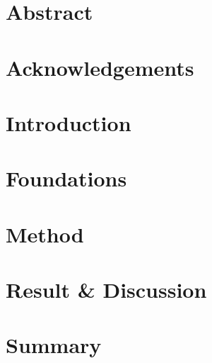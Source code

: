 \setcounter{page}{1}
\pagebreak
\part*{Abstract}

\pagebreak

\part*{Acknowledgements}

\pagebreak


\tableofcontents
\listoffigures
\listoftables

\pagebreak


\fancyfoot[CE,LO]{\leftmark}
\fancyfoot[CE,CO]{ }

\part{Introduction}


\pagebreak
\part{Foundations}


\pagebreak
\part{Method}


\pagebreak
\part{Result \& Discussion}


\pagebreak
\part{Summary}




\pagebreak
\printbibliography

%



